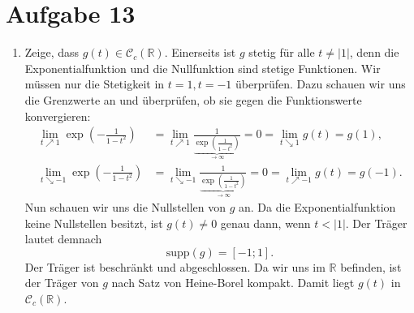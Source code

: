 \documentclass[a4paper,DIV=1]{article}
\theoremstyle{plain}
\begin{document}
\section*{Aufgabe 13}
\begin{enumerate}[label=(\roman*)]
	\item Zeige, dass $g(t) \in\mathcal C_c(\mathbb R)$. Einerseits ist $g$ stetig für alle $t \neq |1|$, denn die Exponentialfunktion und die Nullfunktion sind stetige Funktionen. Wir müssen nur die Stetigkeit in $t=1, t=-1$ überprüfen. Dazu schauen wir uns die Grenzwerte an und überprüfen, ob sie gegen die Funktionswerte konvergieren:
	\begin{align*}
		\lim_{t \nearrow 1} \exp(-\frac{1}{1-t^2}) &= \lim_{t \nearrow 1} \frac{1}{\underbrace{\exp(\frac{1}{1-t^2})}_{\to \infty}} = 0 = \lim_{t \searrow 1}g(t) = g(1), \\
		\lim_{t \searrow -1} \exp(-\frac{1}{1-t^2}) &= \lim_{t \searrow -1} \frac{1}{\underbrace{\exp(\frac{1}{1-t^2})}_{\to \infty}} = 0 = \lim_{t \nearrow -1}g(t) = g(-1).
	\end{align*}
	Nun schauen wir uns die Nullstellen von $g$ an. Da die Exponentialfunktion keine Nullstellen besitzt, ist $g(t) \neq 0$ genau dann, wenn $t < |1|$. Der Träger lautet demnach
	\[
		\mathrm{supp}(g) = [-1;1].
	\]
	Der Träger ist beschränkt und abgeschlossen. Da wir uns im $\mathbb R$ befinden, ist der Träger von $g$ nach Satz von Heine-Borel kompakt. Damit liegt $g(t)$ in $\mathcal C_c(\mathbb R)$.
	

\end{enumerate}
\end{document}
